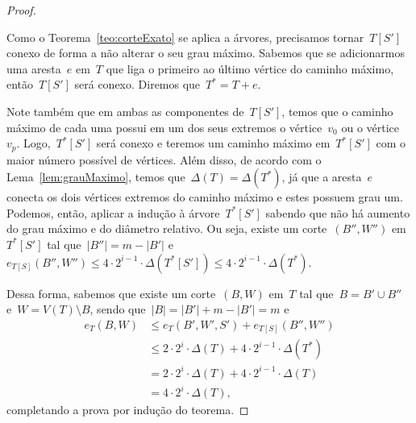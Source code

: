 \begin{proof}
\begin{center}
\begin{tikzpicture}
			\end{tikzpicture} \end{center}
			Como o Teorema~\ref{teo:corteExato} se aplica a 
			árvores, precisamos tornar~$T[S']$ conexo de forma a não 
			alterar o seu grau máximo.
			Sabemos que se adicionarmos uma aresta~$e$ em~$T$ que 
			liga o primeiro ao último vértice do caminho máximo,
			então~$T[S']$ será conexo. 
			Diremos que~${T^* = T+ e}$.

			Note também que em ambas as componentes de~$T[S']$, 
			temos que o caminho máximo de cada uma possui em um dos
			seus extremos o vértice~$v_0$ ou o vértice~$v_p$.
			Logo,~$T^*[S']$ será conexo e 
			teremos um caminho máximo 
			em~$T^*[S']$ com o maior número possível de vértices.
			Além disso, de acordo com o Lema~\ref{lem:grauMaximo}, 
			temos que~${\Delta(T) = \Delta(T^*)}$, já que a aresta~$e$ 
			conecta os dois vértices extremos do caminho máximo
			e estes possuem grau um.
			Podemos, então, aplicar a indução à árvore~$T^*[S']$ 
			sabendo que não há aumento
			do grau máximo e do diâmetro relativo.
			Ou seja,
			existe um corte~$(B'',W'')$ em~$T^*[S']$
			tal que~${|B''|=m-|B'|}$ 
			e~${e_{T[S]}(B'',W'')\le 4\cdot 2^{i-1}\cdot
			\Delta(T^*[S'])\le 4\cdot 2^{i-1}\cdot\Delta(T^*)}$.

			Dessa forma, sabemos que existe um corte~$(B,W)$ em~$T$ tal
			que~${B=B'\cup B''}$ e~${W=V(T)\setminus B}$, sendo 
			que~${|B|=|B'| + m-|B'| = m}$ e
			\begin{align}
				e_T(B,W)&\le e_T(B',W',S') + e_{T[S]}(B'',W'') 
				\nonumber\\
				&\le 2\cdot2^i\cdot\Delta(T) + 4\cdot 2^{i-1}\cdot
				\Delta(T^*)\nonumber\\
				&= 2\cdot2^i\cdot\Delta(T) + 4\cdot 2^{i-1}\cdot
				\Delta(T)\nonumber\\
				&= 4\cdot 2^{i}\cdot\Delta(T), \nonumber
			\end{align}
			completando a prova por indução do teorema.
	\end{proof}

